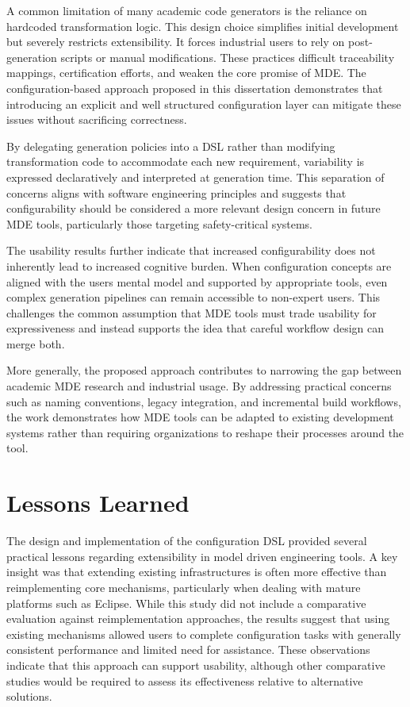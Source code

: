 A common limitation of many academic code generators is the reliance on hardcoded transformation logic. This design choice simplifies initial development but severely restricts extensibility. It forces industrial users to rely on post-generation scripts or manual modifications. These practices difficult traceability mappings, certification efforts, and weaken the core promise of \gls{MDE}. The configuration-based approach proposed in this dissertation demonstrates that introducing an explicit and well structured configuration layer can mitigate these issues without sacrificing correctness.

By delegating generation policies into a \gls{DSL} rather than modifying transformation code to accommodate each new requirement, variability is expressed declaratively and interpreted at generation time. This separation of concerns aligns with software engineering principles and suggests that configurability should be considered a more relevant design concern in future \gls{MDE} tools, particularly those targeting safety-critical systems.

The usability results further indicate that increased configurability does not inherently lead to increased cognitive burden. When configuration concepts are aligned with the users mental model and supported by appropriate tools, even complex generation pipelines can remain accessible to non-expert users. This challenges the common assumption that \gls{MDE} tools must trade usability for expressiveness and instead supports the idea that careful workflow design can merge both.

More generally, the proposed approach contributes to narrowing the gap between academic \gls{MDE} research and industrial usage. By addressing practical concerns such as naming conventions, legacy integration, and incremental build workflows, the work demonstrates how \gls{MDE} tools can be adapted to existing development systems rather than requiring organizations to reshape their processes around the tool.  


\section{Lessons Learned}
\label{sec:lessons}

The design and implementation of the configuration \gls{DSL} provided several practical lessons regarding extensibility in model driven engineering tools. A key insight was that extending existing infrastructures is often more effective than reimplementing core mechanisms, particularly when dealing with mature platforms such as Eclipse. While this study did not include a comparative evaluation against reimplementation approaches, the results suggest that using existing mechanisms allowed users to complete configuration tasks with generally consistent performance and limited need for assistance. These observations indicate that this approach can support usability, although other comparative studies would be required to assess its effectiveness relative to alternative solutions.

